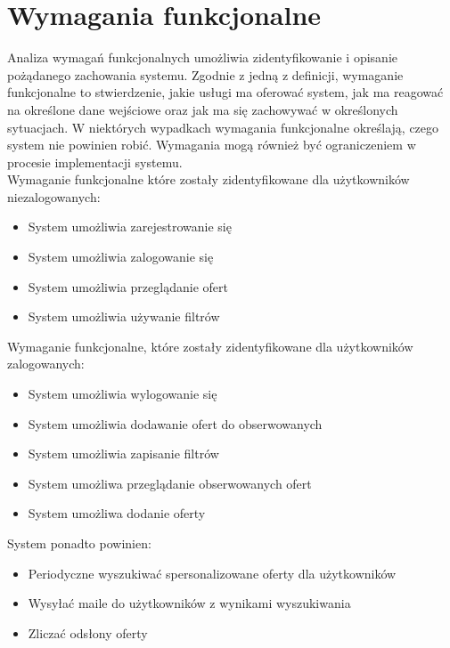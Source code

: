 \section{Wymagania funkcjonalne}
\label{sec:wymaganiaFunkcjonalne}
Analiza wymagań funkcjonalnych umożliwia zidentyfikowanie i opisanie pożądanego zachowania systemu. Zgodnie z jedną z definicji, wymaganie funkcjonalne to stwierdzenie, jakie usługi ma oferować system, jak ma reagować na określone dane wejściowe oraz jak ma się zachowywać w określonych sytuacjach. W niektórych wypadkach wymagania funkcjonalne określają, czego system nie powinien robić. Wymagania mogą również być ograniczeniem w procesie implementacji systemu.\cite{requirements}\\ Wymaganie funkcjonalne które zostały zidentyfikowane dla użytkowników niezalogowanych:
\begin{itemize}
\item System umożliwia zarejestrowanie się
\item System umożliwia zalogowanie się 
\item System umożliwia przeglądanie ofert
\item System umożliwia używanie filtrów
\end{itemize}
Wymaganie funkcjonalne, które zostały zidentyfikowane dla użytkowników zalogowanych:
\begin{itemize}
\item System umożliwia wylogowanie się
\item System umożliwia dodawanie ofert do obserwowanych
\item System umożliwia zapisanie filtrów
\item System umożliwa przeglądanie obserwowanych ofert
\item System umożliwa dodanie oferty 
\end{itemize}
System ponadto powinien:
\begin{itemize}
\item Periodyczne wyszukiwać spersonalizowane oferty dla użytkowników
\item Wysyłać maile do użytkowników z wynikami wyszukiwania
\item Zliczać odsłony oferty
\end{itemize}

